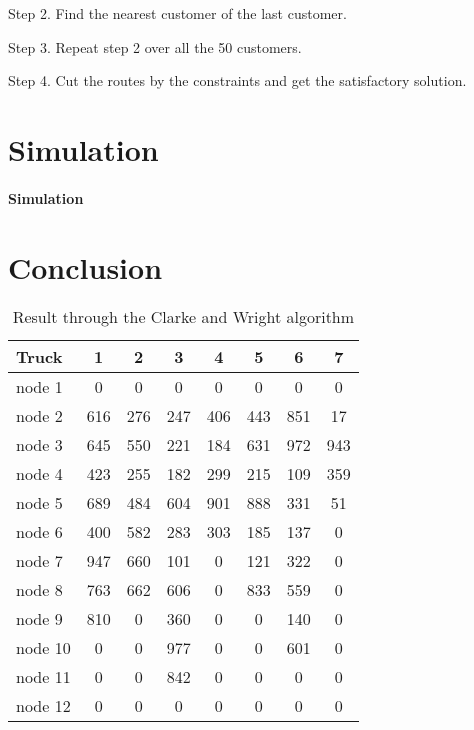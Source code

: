 \documentclass[12pt]{article}
\numberwithin{equation}{section}
\begin{document}
Step 2. Find the nearest customer of the last customer.

Step 3. Repeat step 2 over all the 50 customers.

Step 4. Cut the routes by the constraints and get the satisfactory solution.
			
		
		
\section{Simulation}\label{simu}
	\paragraph{Simulation}	
	


\section{Conclusion}\label{conclution}
	
\begin{table}[htbp]
  \centering
  \caption{Result through the Clarke and Wright algorithm}
    \begin{tabular}{lccccccc}
    \hline
    Truck & 1     & 2     & 3     & 4     & 5     & 6     & 7 \\
    \hline
    node 1 & 0     & 0     & 0     & 0     & 0     & 0     & 0 \\
    node 2 & 616   & 276   & 247   & 406   & 443   & 851   & 17 \\
    node 3 & 645   & 550   & 221   & 184   & 631   & 972   & 943 \\
    node 4 & 423   & 255   & 182   & 299   & 215   & 109   & 359 \\
    node 5 & 689   & 484   & 604   & 901   & 888   & 331   & 51 \\
    node 6 & 400   & 582   & 283   & 303   & 185   & 137   & 0 \\
    node 7 & 947   & 660   & 101   & 0     & 121   & 322   & 0 \\
    node 8 & 763   & 662   & 606   & 0     & 833   & 559   & 0 \\
    node 9 & 810   & 0     & 360   & 0     & 0     & 140   & 0 \\
    node 10 & 0     & 0     & 977   & 0     & 0     & 601   & 0 \\
    node 11 & 0     & 0     & 842   & 0     & 0     & 0     & 0 \\
    node 12 & 0     & 0     & 0     & 0     & 0     & 0     & 0 \\
    \hline
    \end{tabular}%
  \label{tab:CW}%
\end{table}%
\end{document}
